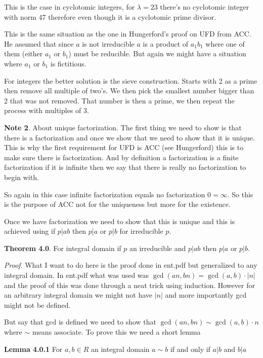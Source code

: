 \documentclass[aps,preprint,preprintnumbers,nofootinbib,showpacs,prd]{revtex4-1}
\begin{document}
This is the case in cyclotomic integers, for $\lambda = 23$ there's no cyclotomic integer with norm 47 therefore even though it is a cyclotomic prime divisor. 

This is the same situation as the one in Hungerford's proof on UFD from ACC. He assumed that since $a$ is not irreducible $a$ is a product of $a_1b_1$ where one of them (either $a_1$ or $b_1$) must be reducible. But again we might have a situation where $a_1$ or $b_1$ is fictitious.

For integers the better solution is the sieve construction. Starts with 2 as a prime then remove all multiple of two's. We then pick the smallest number bigger than 2 that was not removed. That number is then a prime, we then repeat the process with multiples of 3.



{\bf Note 2}. About unique factorization. The first thing we need to show is that there is a factorization and once we show that we need to show that it is unique. This is why the first requirement for UFD is ACC (see Hungerford) this is to make sure there is factorization. And by definition a factorization is a finite factorization if it is infinite then we say that there is really no factorization to begin with.

So again in this case infinite factorization equals no factorization $0 = \infty$. So this is the purpose of ACC not for the uniqueness but more for the existence.

Once we have factorization we need to show that this is unique and this is achieved using if $p|ab$ then $p|a$ or $p|b$ for irreducible $p$.




{\bf Theorem 4.0}. For integral domain if $p$ an irreducible and $p|ab$ then $p|a$ or $p|b$.

{\it Proof}. What I want to do here is the proof done in ent.pdf but generalized to any integral domain. In ent.pdf what was used was $\gcd(an, bn) = \gcd(a,b) \cdot |n|$ and the proof of this was done through a neat trick using induction. However for an arbitrary integral domain we might not have $|n|$ and more importantly gcd might not be defined.

But say that gcd is defined we need to show that $\gcd(an, bn) \sim \gcd(a,b) \cdot n$ where $\sim$ means associate. To prove this we need a short lemma

{\bf Lemma 4.0.1} For $a,b \in R$ an integral domain $a \sim b$ if and only if $a|b$ and $b|a$ 
\end{document}
